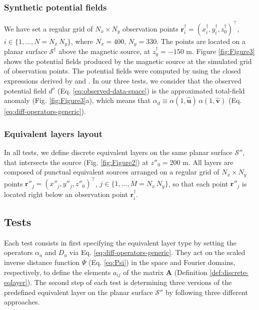 \subsubsection{Synthetic potential fields}

We have set a regular grid of $N_{x} \times N_{y}$ observation points 
$\mathbf{r}^{\dagger}_{i} = (x^{\dagger}_{i}, y^{\dagger}_{i}, z^{\dagger}_{0})^{\top}$, $i \in \{1, \dots, N = N_{x} \, N_{y}\}$,
where $N_{x} = 400$, $N_{y} = 330$. 
The points are located on a planar surface $\mathcal{S}^{\dagger}$ above the magnetic source,
at $z^{\dagger}_{0} = -150$ m.
Figure \ref{fig:Figure3} shows the potential fields produced by the magnetic source at 
the simulated grid of observation points.
The potential fields were computed by using the closed expressions derived by \cite{Nagyetal2000, Nagyetal2002} 
and \cite{Fukushima2020}.
In our three tests, we consider that the observed potential field $d^{o}$ (Eq.  
\ref{eq:observed-data-space}) 
is the approximated total-field anomaly (Fig. \ref{fig:Figure3}a), which means that 
$\alpha_{d} \equiv \alpha(1, \hat{\mathbf{u}}) \, \alpha(1, \hat{\mathbf{v}})$ (Eq. \ref{eq:diff-operators-generic}).

\subsubsection{Equivalent layers layout}

In all tests, we define discrete equivalent layers on the same planar surface $\mathcal{S}''$, 
that intersects the source (Fig. \ref{fig:Figure2}) at $z''_{0} = 200$ m.
All layers are composed of punctual equivalent sources arranged on a regular grid of $N_{x} \times N_{y}$ points 
$\mathbf{r}''_{j} = (x''_{j}, y''_{j}, z''_{0})^{\top}$, $j \in \{1, \dots, M = N_{x} \, N_{y}\}$,
so that each point $\mathbf{r}''_{j}$ is located right below an observation point $\mathbf{r}^{\dagger}_{i}$.

\subsection{Tests}

Each test consists in first specifying the equivalent layer type by setting the operators $\alpha_{a}$ and $D_{a}$ 
via Eq. \ref{eq:diff-operators-generic}.
They act on the scaled inverse distance function $\Psi$ 
(Eq. \ref{eq:Psi}) in the space and Fourier domains,
respectively, to define the elements $a_{ij}$ of the matrix $\mathbf{A}$ 
(Definition \ref{def:discrete-eqlayer}).
The second step of each test is determining three versions of the predefined equivalent layer 
on the planar surface $\mathcal{S}''$ by following three different approaches.

